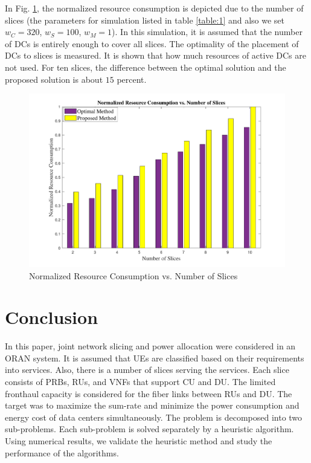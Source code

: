 \documentclass[conference]{IEEEtran}
\begin{document}
In Fig. \ref{fig:f2}, the normalized resource consumption is depicted due to the number of slices (the parameters for simulation listed in table \ref{table:1} and also we set $w_C = 320$, $w_S = 100$, $w_M =1$). In this simulation, it is assumed that the number of DCs is entirely enough to cover all slices. The optimality of the placement of DCs to slices is measured. It is shown that how much resources of active DCs are not used. For ten slices, the difference between the optimal solution and the proposed solution is about $15$ percent.
\begin{figure}%
  \centering
    \includegraphics[width=\linewidth]{fig22_last}
  \caption{Normalized Resource Consumption vs. Number of Slices}
  \label{fig:f2}
\end{figure}
\section{Conclusion}
In this paper, joint network slicing and power allocation were considered in an ORAN system. It is assumed that UEs are classified based on their requirements into services. Also, there is a number of slices serving the services. Each slice consists of PRBs, RUs, and VNFs that support CU and DU. The limited fronthaul capacity is considered for the fiber links between RUs and DU.
The target was to maximize the sum-rate and minimize the power consumption and energy cost of data centers simultaneously.
The problem is decomposed into two sub-problems. Each sub-problem is solved separately by a heuristic algorithm. Using numerical results, we validate the heuristic method and study the performance of the algorithms. %




\end{document}
